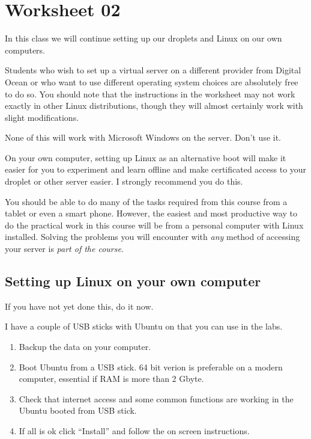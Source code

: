 \documentclass[12pt,a4paper]{article}
\begin{document}
\section*{Worksheet 02}

In this class we will continue setting up our droplets and Linux on our own computers.


Students who wish to set up a virtual server on a different provider from 
Digital Ocean or who want to use different operating system choices are 
absolutely free to do so. You should note that the instructions in the worksheet may not work exactly in other Linux distributions, though they will almost certainly work with slight modifications.

None of this will work with Microsoft Windows on the server. Don't use it.

On your own computer, setting up Linux as an alternative boot will make it easier for you to experiment and learn offline and make certificated access to your droplet or other server easier. I strongly recommend you do this.

You should be able to do many of the tasks required from this course from a tablet or even a smart phone. However, the easiest and most productive way to do the practical work in this course will be from a personal computer with Linux installed. Solving the problems you will encounter with \emph{any} method of accessing your server is \emph{part of the course}.

\subsection*{Setting up Linux on your own computer}

If you have not yet done this, do it now. 

I have a couple of USB sticks with Ubuntu on that you can use in the labs.


\begin{enumerate}
 \item Backup the data on your computer.
 \item Boot Ubuntu from a USB stick. 64 bit verion is preferable on a modern computer, 
  essential if RAM is more than 2 Gbyte.
 \item Check that internet access and some common functions are working in the Ubuntu booted from USB stick.
 \item If all is ok click ``Install'' and follow the on screen instructions.
\end{enumerate}
\end{document}
